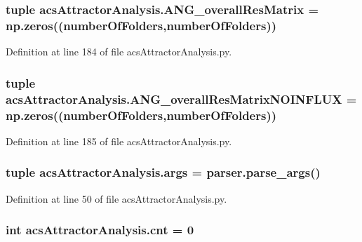 \hypertarget{a00122_a43a783e7bdb1094aa477c438bd67259f}{
\subsubsection[{A\-N\-G\-\_\-overall\-Res\-Matrix}]{\setlength{\rightskip}{0pt plus 5cm}tuple acs\-Attractor\-Analysis.\-A\-N\-G\-\_\-overall\-Res\-Matrix = np.\-zeros(({\bf number\-Of\-Folders},{\bf number\-Of\-Folders}))}}\label{a00122_a43a783e7bdb1094aa477c438bd67259f}


Definition at line 184 of file acs\-Attractor\-Analysis.\-py.

\hypertarget{a00122_a0d0e0ed8583e4aa041fa6c122324311e}{
\subsubsection[{A\-N\-G\-\_\-overall\-Res\-Matrix\-N\-O\-I\-N\-F\-L\-U\-X}]{\setlength{\rightskip}{0pt plus 5cm}tuple acs\-Attractor\-Analysis.\-A\-N\-G\-\_\-overall\-Res\-Matrix\-N\-O\-I\-N\-F\-L\-U\-X = np.\-zeros(({\bf number\-Of\-Folders},{\bf number\-Of\-Folders}))}}\label{a00122_a0d0e0ed8583e4aa041fa6c122324311e}


Definition at line 185 of file acs\-Attractor\-Analysis.\-py.

\hypertarget{a00122_a750e66218ca39f0949f2f92e89136e37}{
\subsubsection[{args}]{\setlength{\rightskip}{0pt plus 5cm}tuple acs\-Attractor\-Analysis.\-args = parser.\-parse\-\_\-args()}}\label{a00122_a750e66218ca39f0949f2f92e89136e37}


Definition at line 50 of file acs\-Attractor\-Analysis.\-py.

\hypertarget{a00122_a8ec106a228fafb4c290946a7b7f8b6da}{
\subsubsection[{cnt}]{\setlength{\rightskip}{0pt plus 5cm}int acs\-Attractor\-Analysis.\-cnt = 0}}\label{a00122_a8ec106a228fafb4c290946a7b7f8b6da}


